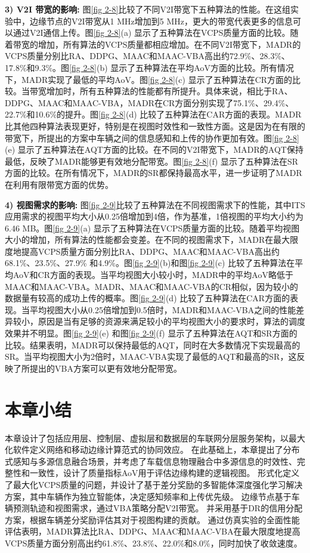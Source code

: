 \textbf{3) V2I 带宽的影响:}
图\ref{fig 2-8}比较了不同V2I带宽下五种算法的性能。在这组实验中，边缘节点的V2I带宽从1 MHz增加到5 MHz，更大的带宽代表更多的信息可以通过V2I通信上传。图\ref{fig 2-8}(a) 显示了五种算法在VCPS质量方面的比较。随着带宽的增加，所有算法的VCPS质量都相应增加。在不同V2I带宽下，MADR的VCPS质量分别比RA、DDPG、MAAC和MAAC-VBA高出约72.9\%、28.3\%、17.8\%和9.3\%。图\ref{fig 2-8}(b) 显示了五种算法在平均AoV方面的比较。所有情况下，MADR实现了最低的平均AoV。图\ref{fig 2-8}(c) 显示了五种算法在CR方面的比较。当带宽增加时，所有五种算法的性能都有所提升。具体来说，相比于RA、DDPG、MAAC和MAAC-VBA，MADR在CR方面分别实现了75.1\%、29.4\%、22.7\%和10.6\%的提升。图\ref{fig 2-8}(d) 比较了五种算法在CAR方面的表现。MADR比其他四种算法表现更好，特别是在视图时效性和一致性方面。这是因为在有限的带宽下，所提出的方案中车辆之间的信息感知和上传的协作更加有效。图\ref{fig 2-8}(e) 显示了五种算法在AQT方面的比较。在不同的V2I带宽下，MADR的AQT保持最低，反映了MADR能够更有效地分配带宽。图\ref{fig 2-8}(f) 显示了五种算法在SR方面的比较。在所有情况下，MADR的SR都保持最高水平，进一步证明了MADR在利用有限带宽方面的优势。

\textbf{4) 视图需求的影响:}
图\ref{fig 2-9}比较了五种算法在不同视图需求下的性能，其中ITS应用需求的视图平均大小从0.25倍增加到4倍，作为基准，1倍视图的平均大小约为6.46 MB。图\ref{fig 2-9}(a) 显示了五种算法在VCPS质量方面的比较。随着平均视图大小的增加，所有算法的性能都会变差。在不同的视图需求下，MADR在最大限度地提高VCPS质量方面分别比RA、DDPG、MAAC和MAAC-VBA高出约68.1\%、23.5\%、27.9\% 和4.9\%。图\ref{fig 2-9}(b)和图\ref{fig 2-9}(c) 比较了五种算法在平均AoV和CR方面的表现。当平均视图大小较小时，MADR中的平均AoV略低于MAAC和MAAC-VBA。MADR、MAAC和MAAC-VBA的CR相似，因为较小的数据量有较高的成功上传的概率。图\ref{fig 2-9}(d) 比较了五种算法在CAR方面的表现。当平均视图大小从0.25倍增加到0.5倍时，MADR和MAAC-VBA之间的性能差异较小，原因是当有足够的资源来满足较小的平均视图大小的要求时，算法的调度效果并不明显。图\ref{fig 2-9}(e) 和图\ref{fig 2-9}(f) 显示了五种算法在AQT和SR方面的比较。结果表明，MADR可以保持最低的AQT，同时在大多数情况下实现最高的SR。当平均视图大小为2倍时，MAAC-VBA实现了最低的AQT和最高的SR，这反映了所提出的VBA方案可以更有效地分配带宽。

\section{本章小结}\label{section 2-7}

本章设计了包括应用层、控制层、虚拟层和数据层的车联网分层服务架构，以最大化软件定义网络和移动边缘计算范式的协同效应。
在此基础上，本章提出了分布式感知与多源信息融合场景，并考虑了车载信息物理融合中多源信息的时效性、完整性和一致性，设计了质量指标AoV用于评估边缘构建的逻辑视图。
形式化定义了最大化VCPS质量的问题，并设计了基于差分奖励的多智能体深度强化学习解决方案，其中车辆作为独立智能体，决定感知频率和上传优先级。
边缘节点基于车辆预测轨迹和视图需求，通过VBA策略分配V2I带宽。
并采用基于DR的信用分配方案，根据车辆差分奖励评估其对于视图构建的贡献。
通过仿真实验的全面性能评估表明，MADR算法比RA、DDPG、MAAC和MAAC-VBA在最大限度地提高VCPS质量方面分别高出约61.8\%、23.8\%、22.0\%和8.0\%，同时加快了收敛速度。
